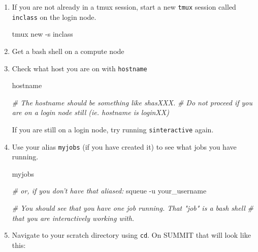 \documentclass[]{krantz}
\makeatletter
\newenvironment{Shaded}{\begin{snugshade}}{\end{snugshade}}
\newcommand{\CommentTok}[1]{\textcolor[rgb]{0.37,0.37,0.37}{\textit{#1}}}
\newcommand{\ExtensionTok}[1]{#1}
\newcommand{\FunctionTok}[1]{\textcolor[rgb]{0,0,0}{#1}}
\newcommand{\NormalTok}[1]{#1}
\newcommand{\VariableTok}[1]{\textcolor[rgb]{0,0,0}{#1}}
\newenvironment{kframe}{%
\medskip{}
\setlength{\fboxsep}{.8em}
 \def\at@end@of@kframe{}%
 \ifinner\ifhmode%
  \def\at@end@of@kframe{\end{minipage}}%
  \begin{minipage}{\columnwidth}%
 \fi\fi%
 \def\FrameCommand##1{\hskip\@totalleftmargin \hskip-\fboxsep
 \colorbox{shadecolor}{##1}\hskip-\fboxsep
     \hskip-\linewidth \hskip-\@totalleftmargin \hskip\columnwidth}%
 \MakeFramed {\advance\hsize-\width
   \@totalleftmargin\z@ \linewidth\hsize
   \@setminipage}}%
 {\par\unskip\endMakeFramed%
 \at@end@of@kframe}
\renewenvironment{Shaded}{\begin{kframe}}{\end{kframe}}
\makeatother
\begin{document}
\begin{enumerate}
\def\labelenumi{\arabic{enumi}.}
\item
  If you are not already in a tmux session, start a new \texttt{tmux} session called \texttt{inclass} on the login node.

\begin{Shaded}
\begin{Highlighting}[]
\ExtensionTok{tmux}\NormalTok{ new -s inclass}
\end{Highlighting}
\end{Shaded}
\item
  Get a bash shell on a compute node

\begin{Shaded}
\end{Shaded}
\item
  Check what host you are on with \texttt{hostname}

\begin{Shaded}
\begin{Highlighting}[]
\FunctionTok{hostname}

\CommentTok{# The hostname should be something like shasXXX. }
\CommentTok{#  Do not proceed if you are on a login node still (ie. hostname is loginXX)}
\end{Highlighting}
\end{Shaded}

  If you are still on a login node, try running \texttt{sinteractive} again.
\item
  Use your alias \texttt{myjobs} (if you have created it) to see what jobs you have running.

\begin{Shaded}
\begin{Highlighting}[]
\ExtensionTok{myjobs}

\CommentTok{# or, if you don't have that aliased:}
\ExtensionTok{squeue}\NormalTok{ -u your_username}

\CommentTok{# You should see that you have one job running.  That "job" is a bash shell}
\CommentTok{# that you are interactively working with.}
\end{Highlighting}
\end{Shaded}
\item
  Navigate to your scratch directory using \texttt{cd}. On SUMMIT that will look like this:


\end{enumerate}
\end{document}
